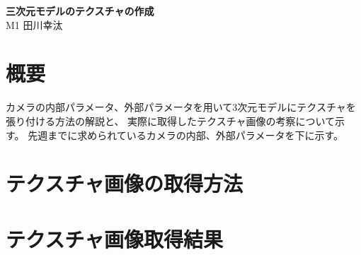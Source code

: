 \documentclass[]{jarticle}          %
\begin{document}

\vspace*{2ex}
\begin{center}
 {\Large \bf 三次元モデルのテクスチャの作成}\\ %
 \vspace*{5mm}
 {\large M1 田川幸汰}%
\end{center}





\section{概要}
カメラの内部パラメータ、外部パラメータを用いて3次元モデルにテクスチャを張り付ける方法の解説と、
実際に取得したテクスチャ画像の考察について示す。
先週までに求められているカメラの内部、外部パラメータを下に示す。


\section{テクスチャ画像の取得方法}

\section{テクスチャ画像取得結果}
\end{document}
